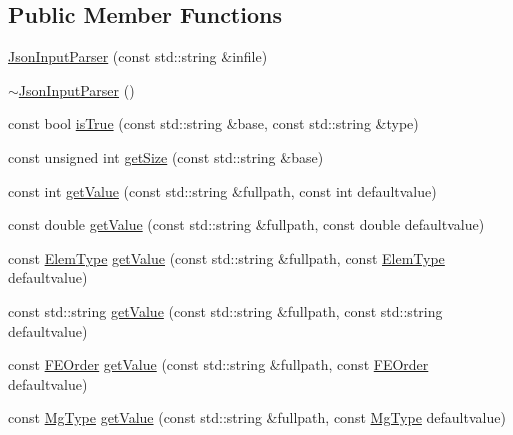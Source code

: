 \subsection*{Public Member Functions}
\begin{DoxyCompactItemize}
\item 
\mbox{\hyperlink{classfemus_1_1_json_input_parser_a007eb525534f5f3c28c63d99f02c53ce}{Json\+Input\+Parser}} (const std\+::string \&infile)
\item 
\mbox{\hyperlink{classfemus_1_1_json_input_parser_afd478d2df10222adde53861eeb693177}{$\sim$\+Json\+Input\+Parser}} ()
\item 
const bool \mbox{\hyperlink{classfemus_1_1_json_input_parser_af6e86057aa2b4bc01fad78ff7340fbc6}{is\+True}} (const std\+::string \&base, const std\+::string \&type)
\item 
const unsigned int \mbox{\hyperlink{classfemus_1_1_json_input_parser_a535b2e19baf4fff32dc5fa54816b0496}{get\+Size}} (const std\+::string \&base)
\item 
const int \mbox{\hyperlink{classfemus_1_1_json_input_parser_a7446c6ec4674101f6e0ad48778122076}{get\+Value}} (const std\+::string \&fullpath, const int defaultvalue)
\item 
const double \mbox{\hyperlink{classfemus_1_1_json_input_parser_a38b41ae56ab7b1b3780c4692d06cbd33}{get\+Value}} (const std\+::string \&fullpath, const double defaultvalue)
\item 
const \mbox{\hyperlink{_elem_type_enum_8hpp_a1b014294b9757a001707c979e2bab627}{Elem\+Type}} \mbox{\hyperlink{classfemus_1_1_json_input_parser_a00598393bac7b29e552167fb6d1c51f6}{get\+Value}} (const std\+::string \&fullpath, const \mbox{\hyperlink{_elem_type_enum_8hpp_a1b014294b9757a001707c979e2bab627}{Elem\+Type}} defaultvalue)
\item 
const std\+::string \mbox{\hyperlink{classfemus_1_1_json_input_parser_af9cad72e2f40793edb81d8136342cf40}{get\+Value}} (const std\+::string \&fullpath, const std\+::string defaultvalue)
\item 
const \mbox{\hyperlink{_f_elem_type_enum_8hpp_a00ea9562f0dbb25e22bb3297d596e3ba}{F\+E\+Order}} \mbox{\hyperlink{classfemus_1_1_json_input_parser_a29fe53a616bd9326081bfa485fc7b455}{get\+Value}} (const std\+::string \&fullpath, const \mbox{\hyperlink{_f_elem_type_enum_8hpp_a00ea9562f0dbb25e22bb3297d596e3ba}{F\+E\+Order}} defaultvalue)
\item 
const \mbox{\hyperlink{_mg_type_enum_8hpp_a35aafc39068a269f658aac64338aa781}{Mg\+Type}} \mbox{\hyperlink{classfemus_1_1_json_input_parser_a6851a934e4f6fa21195bbaef6f3999d9}{get\+Value}} (const std\+::string \&fullpath, const \mbox{\hyperlink{_mg_type_enum_8hpp_a35aafc39068a269f658aac64338aa781}{Mg\+Type}} defaultvalue)

\end{DoxyCompactItemize}
